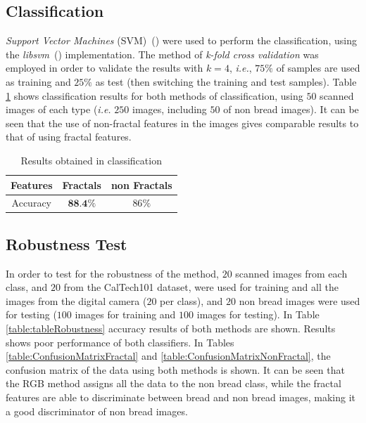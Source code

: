 \documentclass[oneside,a4paper,english,links]{amca}
\begin{document}
\subsection{Classification}
{\em Support Vector Machines} (SVM)~(\cite{Boser92}) were used to perform the classification, using the {\em libsvm}~(\cite{Chang2011}) implementation.
The method of {\em k-fold cross validation} was employed in order to validate the results with $k = 4$, {\em i.e.}, $75\%$ of samples are used as training and $25\%$ as test (then switching the training and test samples). Table \ref{table:tableFirstTest} shows classification results for both methods of classification, using $50$ scanned images of each type ({\em i.e.} $250$ images, including $50$ of non bread images). It can be seen that the use of non-fractal features in the images gives comparable results to that of using fractal features.

\begin{table}[htb]
\centering
\begin{tabular}{|c|c|c|}
    \hline
    Features & Fractals & non Fractals\\
    \hline
    \hline
    Accuracy  & $\textbf{88.4}\%$ & $86\%$\\
    \hline
\end{tabular}
\caption{Results obtained in classification}
\label{table:tableFirstTest}
\end{table}

\subsection{Robustness Test}
In order to test for the robustness of the method, $20$ scanned images from each class, and $20$ from the CalTech101 dataset, were used for training and all the images from the digital camera ($20$ per class), and $20$ non bread images were used for testing ($100$ images for training and $100$ images for testing). In Table \ref{table:tableRobustness} accuracy results of both methods are shown. Results shows poor performance of both classifiers. In Tables \ref{table:ConfusionMatrixFractal} and \ref{table:ConfusionMatrixNonFractal}, the confusion matrix of the data using both methods is shown. It can be seen that the RGB method assigns all the data to the non bread class, while the fractal features are able to discriminate between bread and non bread images, making it a good discriminator of non bread images.
\end{document}
